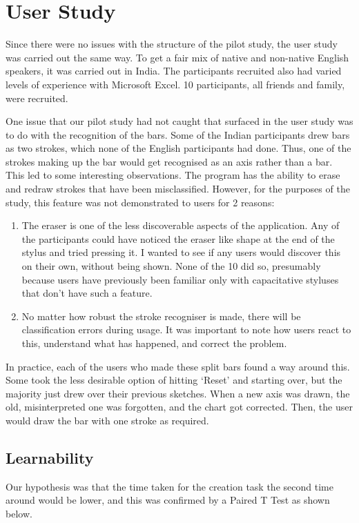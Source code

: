 \section{User Study}
Since there were no issues with the structure of the pilot study, the user study was carried out the same way. To get a fair mix of native and non-native English speakers, it was carried out in India. The participants recruited also had varied levels of experience with Microsoft Excel. 10 participants, all friends and family, were recruited.

One issue that our pilot study had not caught that surfaced in the user study was to do with the recognition of the bars. Some of the Indian participants drew bars as two strokes, which none of the English participants had done. Thus, one of the strokes making up the bar would get recognised as an axis rather than a bar. This led to some interesting observations. The program has the ability to erase and redraw strokes that have been misclassified. However, for the purposes of the study, this feature was not demonstrated to users for 2 reasons:
\begin{enumerate}
\item The eraser is one of the less discoverable aspects of the application. Any of the participants could have noticed the eraser like shape at the end of the stylus and tried pressing it. I wanted to see if any users would discover this on their own, without being shown. None of the 10 did so, presumably because users have previously been familiar only with capacitative styluses that don't have such a feature. 
\item No matter how robust the stroke recogniser is made, there will be classification errors during usage. It was important to note how users react to this, understand what has happened, and correct the problem.
\end{enumerate} 

In practice, each of the users who made these split bars found a way around this. Some took the less desirable option of hitting `Reset' and starting over, but the majority just drew over their previous sketches. When a new axis was drawn, the old, misinterpreted one was forgotten, and the chart got corrected. Then, the user would draw the bar with one stroke as required.

\subsection{Learnability}
Our hypothesis was that the time taken for the creation task the second time around would be lower, and this was confirmed by a Paired T Test as shown below.

